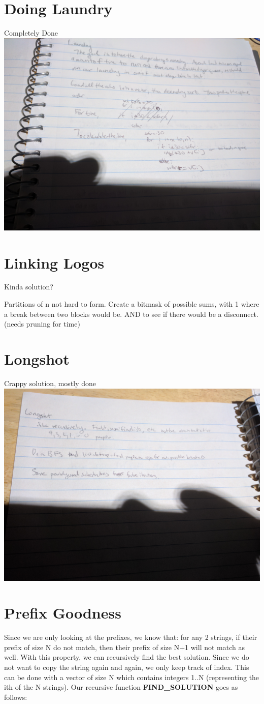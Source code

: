 \documentclass{article}
\begin{document}
\section{Doing Laundry}
Completely Done
\includegraphics[width=.75\textwidth]{laundry}

\section{Linking Logos}
Kinda solution?

Partitions of n not hard to form. Create a bitmask of possible sums, with 1 where a break between two blocks would be. AND to see if there would be a disconnect. (needs pruning for time)

\section{Longshot}
Crappy solution, mostly done
\includegraphics[width=.75\textwidth]{longshot}

\section{Prefix Goodness}
\noindent
Since we are only looking at the prefixes, we know that: for any 2 strings, if their prefix of size N do not match, then their prefix of size N+1 will not match as well. With this property, we can recursively find the best solution. Since we do not want to copy the string again and again, we only keep track of index. This can be done with a vector of size N which contains integers 1..N (representing the ith of the N strings).
Our recursive function \textbf{FIND\_SOLUTION} goes as follows:
\end{document}
